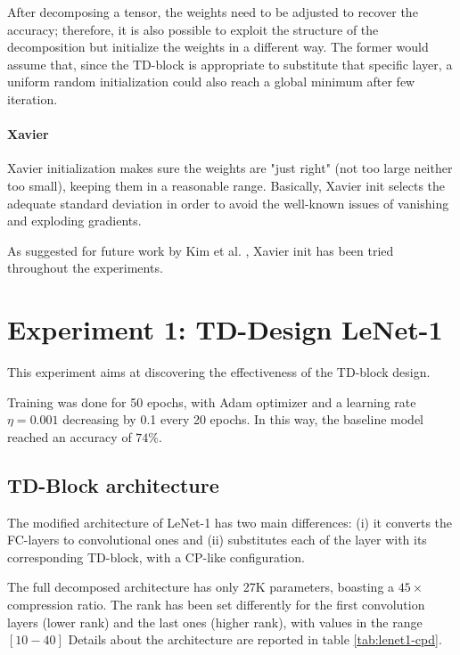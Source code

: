 After decomposing a tensor, the weights need to be adjusted to recover the accuracy; therefore, it is also possible to exploit the structure of the decomposition but initialize the weights in a different way. The former would assume that, since the TD-block is appropriate to substitute that specific layer, a uniform random initialization could also reach a global minimum after few iteration. 

\paragraph{Xavier}
Xavier initialization makes sure the weights are "just right" (not too large neither too small), keeping them in a reasonable range. Basically, Xavier init selects the adequate standard deviation in order to avoid the well-known issues of vanishing and exploding gradients. 

As suggested for future work by Kim et al. \parencite{Tucker-mobile}, Xavier init has been tried throughout the experiments. 


\section{Experiment 1: TD-Design LeNet-1}
This experiment aims at discovering the effectiveness of the TD-block design. 


Training was done for 50 epochs, with Adam optimizer and a learning rate $\eta = 0.001$ decreasing by 0.1 every 20 epochs. In this way, the baseline model reached an accuracy of $74\%$.  

\subsection{TD-Block architecture}
The modified architecture of LeNet-1 has two main differences: (i) it converts the FC-layers to convolutional ones and (ii) substitutes each of the layer with its corresponding TD-block, with a CP-like configuration. 
\newline 

The full decomposed architecture has only 27K parameters, boasting a $45 \times$ compression ratio. The rank has been set differently for the first convolution layers (lower rank) and the last ones (higher rank), with values in the range $[10-40]$ Details about the architecture are reported in table \ref{tab:lenet1-cpd}.

